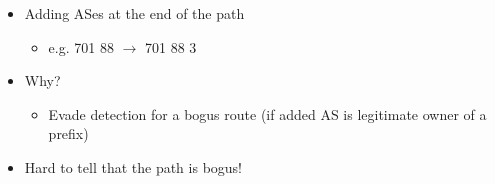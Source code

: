 \begin{itemize}
    \item Adding ASes at the end of the path
          \begin{itemize}
              \item e.g. 701 88 $\to$ 701 88 3
          \end{itemize}
    \item Why?
          \begin{itemize}
              \item Evade detection for a bogus route (if added AS is legitimate owner of a prefix)
          \end{itemize}
    \item Hard to tell that the path is bogus!
\end{itemize}